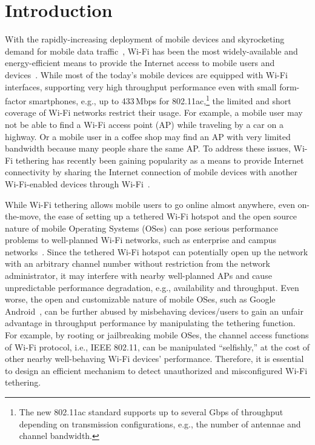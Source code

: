 \section{Introduction}

%
With the rapidly-increasing deployment of mobile devices and skyrocketing
demand for mobile data traffic~\cite{Cisco:13}, Wi-Fi has been the
most widely-available and energy-efficient means to provide the Internet
access to mobile users and devices~\cite{Balasubramanian:09}.
%
While most of the today's mobile devices are equipped with Wi-Fi
interfaces, supporting very high throughput performance even with
small form-factor smartphones, e.g., up to 433\,Mbps for
802.11ac,\footnote{The new 802.11ac standard supports up to several
Gbps of throughput depending on transmission configurations, e.g.,
the number of antennae and channel bandwidth.} the limited and short
coverage of Wi-Fi networks restrict their usage.
%
For example, a mobile user may not be able to find a Wi-Fi access
point (AP) while traveling by a car on a highway. Or a mobile
user in a coffee shop may find an AP with very limited bandwidth
because many people share the same AP.
%
To address these issues, Wi-Fi tethering has recently been gaining
popularity as a means to provide Internet connectivity by sharing the
Internet connection of mobile devices with another Wi-Fi-enabled devices
through Wi-Fi~\cite{Choi:Shin11}.

While Wi-Fi tethering allows mobile users to go online almost anywhere,
even on-the-move, the ease of setting up a tethered Wi-Fi hotspot
and the open source nature of mobile Operating Systems (OSes) can pose
serious performance problems to well-planned Wi-Fi networks, such as
enterprise and campus networks~\cite{Himanshu2010}.
%
Since the tethered Wi-Fi hotspot can potentially open up the network
with an arbitrary channel number without restriction from the network
administrator, it may interfere with nearby well-planned APs and cause
unpredictable performance degradation, e.g., availability and throughput.
%
Even worse, the open and customizable nature of mobile OSes, such as
Google Android~\cite{Android}, can be further abused by misbehaving
devices/users to gain an unfair advantage in throughput performance
by manipulating the tethering function.
%
For example, by rooting or jailbreaking mobile OSes, the channel access
functions of Wi-Fi protocol, i.e., IEEE 802.11, can be manipulated
``selfishly,'' at the cost of other nearby well-behaving Wi-Fi
devices' performance.
%
Therefore, it is essential to design an efficient mechanism to detect
unauthorized and misconfigured Wi-Fi tethering.

